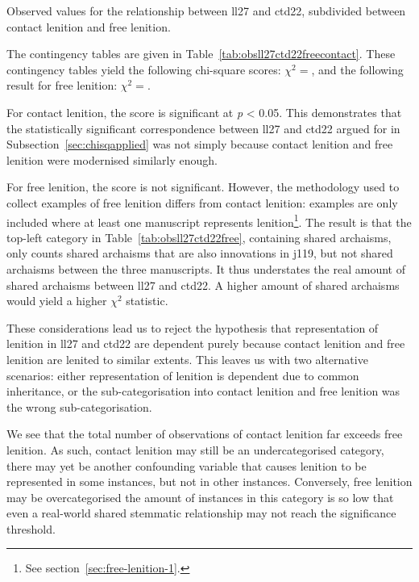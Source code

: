 \begin{table}[h]
  \centering
  \hfill
  \caption{Observed values for the relationship between \gls{ll27} and \gls{ctd22}, subdivided between contact lenition and free lenition.}
  \label{tab:obsll27ctd22freecontact}
\end{table}
The contingency tables are given in Table~\ref{tab:obsll27ctd22freecontact}. These contingency tables yield the following chi-square scores: \(\chi^2 = \), and the following result for free lenition: \(\chi^2 = \).

For contact lenition, the score is significant at \emph{p} < 0.05. This demonstrates that the statistically significant correspondence between \gls{ll27} and \gls{ctd22} argued for in Subsection~\ref{sec:chisqapplied} was not simply because contact lenition and free lenition were modernised similarly enough. 

For free lenition, the score is not significant. However, the methodology used to collect examples of free lenition differs from contact lenition: examples are only included where at least one manuscript represents lenition\footnote{See section~\ref{sec:free-lenition-1}.}. The result is that the top-left category in Table~\ref{tab:obsll27ctd22free}, containing shared archaisms, only counts shared archaisms that are also innovations in \gls{j119}, but not shared archaisms between the three manuscripts. It thus understates the real amount of shared archaisms between \gls{ll27} and \gls{ctd22}. A higher amount of shared archaisms would yield a higher \(\chi^2\) statistic.

These considerations lead us to reject the hypothesis that representation of lenition in \gls{ll27} and \gls{ctd22} are dependent purely because contact lenition and free lenition are lenited to similar extents. This leaves us with two alternative scenarios: either representation of lenition is dependent due to common inheritance, or the sub-categorisation into contact lenition and free lenition was the wrong sub-categorisation.

We see that the total number of observations of contact lenition far exceeds free lenition. As such, contact lenition may still be an undercategorised category, \ie there may yet be another confounding variable that causes lenition to be represented in some instances, but not in other instances. Conversely, free lenition may be overcategorised \ie the amount of instances in this category is so low that even a real-world shared stemmatic relationship may not reach the significance threshold. 

